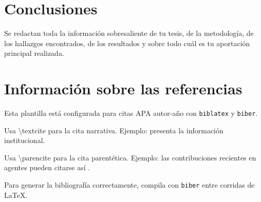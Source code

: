 \chapter{Conclusiones}\label{Cap_04}
\lettrine[lines=2,nindent=0pt]{S}{}e redactan toda la información sobresaliente de tu tesis, de la metodología, de los hallazgos encontrados, de los resultados y sobre todo cuál es tu aportación principal realizada. 

\chapter{Información sobre las referencias}\label{Cap_05}

Esta plantilla está configurada para citas APA autor-año con \texttt{biblatex} y \texttt{biber}.

Usa \textbackslash textcite para la cita narrativa. Ejemplo: \textcite{unade2025} presenta la información institucional.

Usa \textbackslash parencite para la cita parentética. Ejemplo: las contribuciones recientes en agentes pueden citarse así \parencite{urteaga2026agentcards}.

Para generar la bibliografía correctamente, compila con \texttt{biber} entre corridas de LaTeX.

\lipsum[1-10] %

\nocite{lamport1994latex}
\nocite{knuth1984texbook}
\nocite{apa2020manual}
\nocite{blei2003lda}
\nocite{vaswani2017attention}
\nocite{hevner2004designscience}